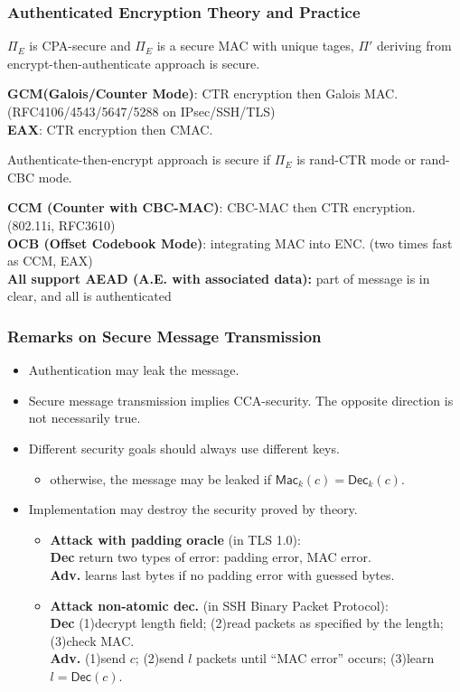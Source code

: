 \begin{frame}\frametitle{Authenticated Encryption Theory and Practice}
\begin{theorem}
$\Pi_E$ is CPA-secure and $\Pi_E$ is a secure MAC with unique tages, $\Pi'$ deriving from encrypt-then-authenticate approach is secure.
\end{theorem}
\textbf{GCM(Galois/Counter Mode)}: CTR encryption then Galois MAC. (RFC4106/4543/5647/5288 on IPsec/SSH/TLS)\\
\textbf{EAX}: CTR encryption then CMAC.
\begin{proposition}
Authenticate-then-encrypt approach is secure if $\Pi_E$ is rand-CTR mode or rand-CBC mode.
\end{proposition}
\textbf{CCM (Counter with CBC-MAC)}: CBC-MAC then CTR encryption. (802.11i, RFC3610)\\
\textbf{OCB (Offset Codebook Mode)}: integrating MAC into ENC. (two times fast as CCM, EAX)\\
\textbf{All support AEAD (A.E. with associated data):} part of message is in clear, and all is authenticated
\end{frame}
\begin{frame}\frametitle{Remarks on Secure Message Transmission}
\begin{itemize}
\item Authentication may leak the message.
\item Secure message transmission implies CCA-security. The opposite direction is not necessarily true.
\item Different security goals should always use different keys.
\begin{itemize}
\item otherwise, the message may be leaked if $\mathsf{Mac}_k(c)=\mathsf{Dec}_k(c)$.
\end{itemize}
\item Implementation may destroy the security proved by theory.
\begin{itemize}
\item \textbf{Attack with padding oracle} (in TLS 1.0): \\
\textbf{Dec} return two types of error: padding error, MAC error. \\
\textbf{Adv.} learns last bytes if no padding error with guessed bytes. 
\item \textbf{Attack non-atomic dec.} (in SSH Binary Packet Protocol):\\
\textbf{Dec} (1)decrypt length field; (2)read packets as specified by the length; (3)check MAC. \\
\textbf{Adv.} (1)send $c$; (2)send $l$ packets until ``MAC error'' occurs; (3)learn $l = \mathsf{Dec}(c)$. 
\end{itemize}
\end{itemize}
\end{frame}
